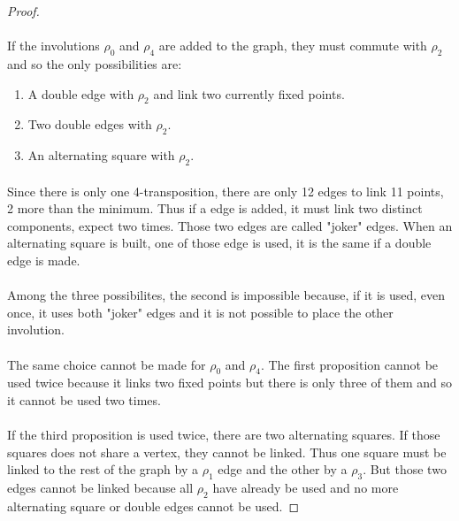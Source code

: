 \begin{proof}
\paragraph{}
If the involutions $\rho_0$ and $\rho_4$ are added to the graph, they must commute with $\rho_2$ and so the only possibilities are:
\begin{enumerate}
  \item A double edge with $\rho_2$ and link two currently fixed points.
  \item Two double edges with $\rho_2$.
  \item An alternating square with $\rho_2$.
\end{enumerate}

\paragraph{}
Since there is only one 4-transposition, there are only 12 edges to link 11 points, 2 more than the minimum. Thus if a edge is added, it must link two distinct components, expect two times. Those two edges are called "joker" edges. When an alternating square is built, one of those edge is used, it is the same if a double edge is made.

\paragraph{}
Among the three possibilites, the second is impossible because, if it is used, even once, it uses both "joker" edges and it is not possible to place the other involution.

\paragraph{}
The same choice cannot be made for $\rho_0$ and $\rho_4$. The first proposition cannot be used twice because it links two fixed points but there is only three of them and so it cannot be used two times.

\paragraph{}
If the third proposition is used twice, there are two alternating squares. If those squares does not share a vertex, they cannot be linked. Thus one square must be linked to the rest of the graph by a $\rho_1$ edge and the other by a $\rho_3$. But those two edges cannot be linked because all $\rho_2$ have already be used and no more alternating square or double edges cannot be used.


\end{proof}
